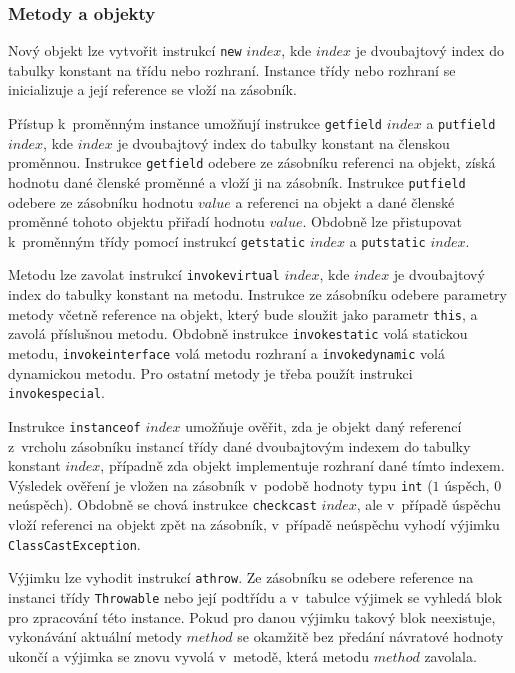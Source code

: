 \subsubsection{Metody a objekty}

Nový objekt lze vytvořit instrukcí \texttt{new} $index$, kde $index$ je dvoubajtový index do tabulky konstant na třídu nebo rozhraní. Instance třídy nebo rozhraní se inicializuje a její reference se vloží na zásobník.

Přístup k~proměnným instance umožňují instrukce \texttt{getfield} $index$ a \texttt{putfield} $index$, kde $index$ je dvoubajtový index do tabulky konstant na členskou proměnnou. Instrukce \texttt{getfield} odebere ze zásobníku referenci na objekt, získá hodnotu dané členské proměnné a vloží ji na zásobník. Instrukce \texttt{putfield} odebere ze zásobníku hodnotu $value$ a referenci na objekt a dané členské proměnné tohoto objektu přiřadí hodnotu $value$. Obdobně lze přistupovat k~proměnným třídy pomocí instrukcí \texttt{getstatic} $index$ a \texttt{putstatic} $index$.

Metodu lze zavolat instrukcí \texttt{invokevirtual} $index$, kde $index$ je dvoubajtový index do tabulky konstant na metodu. Instrukce ze zásobníku odebere parametry metody včetně reference na objekt, který bude sloužit jako parametr \texttt{this}, a zavolá příslušnou metodu. Obdobně instrukce \texttt{invokestatic} volá statickou metodu, \texttt{invokeinterface} volá metodu rozhraní a \texttt{invokedynamic} volá dynamickou metodu. Pro ostatní metody je třeba použít instrukci \texttt{invokespecial}.


Instrukce \texttt{instanceof} $index$ umožňuje ověřit, zda je objekt daný referencí z~vrcholu zásobníku instancí třídy dané dvoubajtovým indexem do tabulky konstant  $index$, případně zda objekt implementuje rozhraní dané tímto indexem. Výsledek ověření je vložen na zásobník v~podobě hodnoty typu \texttt{int} ($1$ úspěch, $0$ neúspěch). Obdobně se chová instrukce \texttt{checkcast} $index$, ale v~případě úspěchu vloží referenci na objekt zpět na zásobník, v~případě neúspěchu vyhodí výjimku \texttt{ClassCastException}.


Výjimku lze vyhodit instrukcí \texttt{athrow}. Ze zásobníku se odebere reference na instanci třídy \texttt{Throwable} nebo její podtřídu a v~tabulce výjimek se vyhledá blok pro zpracování této instance. Pokud pro danou výjimku takový blok neexistuje, vykonávání aktuální metody $method$ se okamžitě bez předání návratové hodnoty ukončí a výjimka se znovu vyvolá v~metodě, která metodu $method$ zavolala. 

